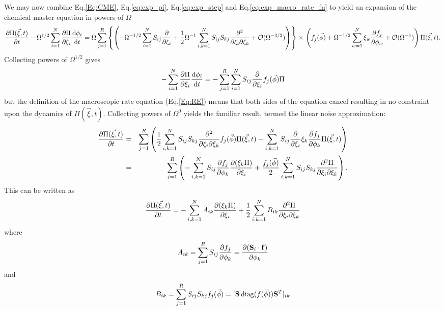 \documentclass[10pt,letterpaper]{article}
\begin{document}
We may now combine Eq.\eqref{Eq:CME}, Eq.\eqref{eq:exp_pi}, Eq.\eqref{eq:exp_step} and Eq.\eqref{eq:exp_macro_rate_fn} to yield an expansion of the chemical master equation in powers of $\Omega$
\begin{dmath}
\pderiv{\Pi(\vec{\xi},t)}{t} - \Omega^{1/2} \sum_{i=1}^N \pderiv{\Pi}{\xi_i} \deriv{\phi_i}{t} =\\ \Omega \sum_{j=1}^R\left\{ \left(- \Omega^{-1/2} \sum_{i=1}^NS_{ij}\pderiv{}{\xi_i} + \frac{1}{2}\Omega^{-1}\sum_{i,k=1}^N S_{ij}S_{kj} \pdd{}{\xi_i}{\xi_k} + \mathcal{O}(\Omega^{-3/2}) \right) \right\}\times\\\left(f_j(\vec{\phi}) + \Omega^{-1/2}\sum_{w=1}^N \xi_w \pderiv{f_j}{\phi_w} + \mathcal{O}(\Omega^{-1}) \right) \Pi(\vec{\xi},t).
\end{dmath}
Collecting powers of $\Omega^{1/2}$ gives
\begin{equation}
-\sum_{i=1}^N \frac{\partial\Pi}{\partial\xi_i} \frac{\text{d}\phi_i}{\text{d}t} = -\sum_{j=1}^R \sum_{i=1}^NS_{ij}\frac{\partial}{\partial\xi_i} f_j(\vec{\phi})\Pi
\end{equation}
but the definition of the macroscopic rate equation (Eq.\eqref{Eq:RE}) means that both sides of the equation cancel resulting in no constraint upon the dynamics of $\Pi(\vec{\xi},t)$. Collecting powers of $\Omega^0$ yields the familiar result, termed the linear noise approximation:
\begin{eqnarray}
\frac{\partial\Pi(\vec{\xi},t)}{\partial t} &=& \sum_{j=1}^R\left( \frac{1}{2} \sum_{i,k=1}^N S_{ij}S_{kj} \frac{\partial^2}{\partial\xi_i\partial\xi_k} f_j(\vec{\phi}) \Pi(\vec{\xi},t) - \sum_{i,k=1}^N S_{ij} \frac{\partial}{\partial\xi_i}\xi_k \frac{\partial f_j}{\partial\phi_k} \Pi(\vec{\xi},t)\right) \nonumber \\
&=& \sum_{j=1}^R\left(- \sum_{i,k=1}^N S_{ij} \frac{\partial f_j}{\partial\phi_k} \frac{\partial(\xi_k \Pi)}{\partial\xi_i}  + \frac{f_j(\vec{\phi})}{2}\sum_{i,k=1}^N S_{ij} S_{kj} \frac{\partial^2\Pi}{\partial\xi_i\partial\xi_k} \right).
\end{eqnarray}
This can be written as
\begin{equation}
\frac{\partial\Pi(\vec{\xi},t)}{\partial t} = - \sum_{i,k=1}^N A_{ik} \frac{\partial(\xi_k \Pi)}{\partial\xi_i} + \frac{1}{2} \sum_{i,k=1}^N B_{ik} \frac{\partial^2\Pi}{\partial\xi_i\partial\xi_k} \label{eq:sse}
\end{equation}
where
\begin{equation}
A_{ik} = \sum_{j=1}^R S_{ij} \frac{\partial f_j}{\partial\phi_k} = \frac{\partial(\mathbf{S}_i\cdot \mathbf{f})}{\partial\phi_k}
\end{equation}
and 
\begin{equation}
B_{ik} = \sum_{j=1}^R  S_{ij} S_{kj} f_j(\vec{\phi}) = [\mathbf{S}\operatorname{diag}(f(\vec{\phi}))\mathbf{S}^T]_{ik}
\end{equation}
\end{document}
